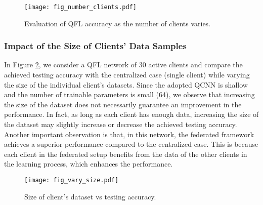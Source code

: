 \documentclass{article}
\begin{document}

\begin{figure}[t]
  \begin{center}
    \texttt{[image: fig\_number\_clients.pdf]}
    \caption{Evaluation of QFL accuracy as the number of clients varies.}\label{fig_num_clients}
  \end{center}
\end{figure}


\subsubsection{Impact of the Size of Clients' Data Samples}
In Figure \ref{fig_data_size}, we consider a QFL network of 30 active clients and compare the achieved testing accuracy with the centralized case (single client) while varying the size of the individual client's datasets. Since the adopted QCNN is shallow and the number of trainable parameters is small (64), we observe that increasing the size of the dataset does not necessarily guarantee an improvement in the performance. In fact, as long as each client has enough data, increasing the size of the dataset may slightly increase or decrease the achieved testing accuracy. Another important observation is that, in this network, the federated framework achieves a superior performance compared to the centralized case. This is because each client in the federated setup benefits from the data of the other clients in the learning process, which enhances the performance. 

\begin{figure}[ht]
  \begin{center}
    \texttt{[image: fig\_vary\_size.pdf]}
    \caption{Size of client's dataset vs testing accuracy.}\label{fig_data_size}
  \end{center}
\end{figure}

\end{document}
